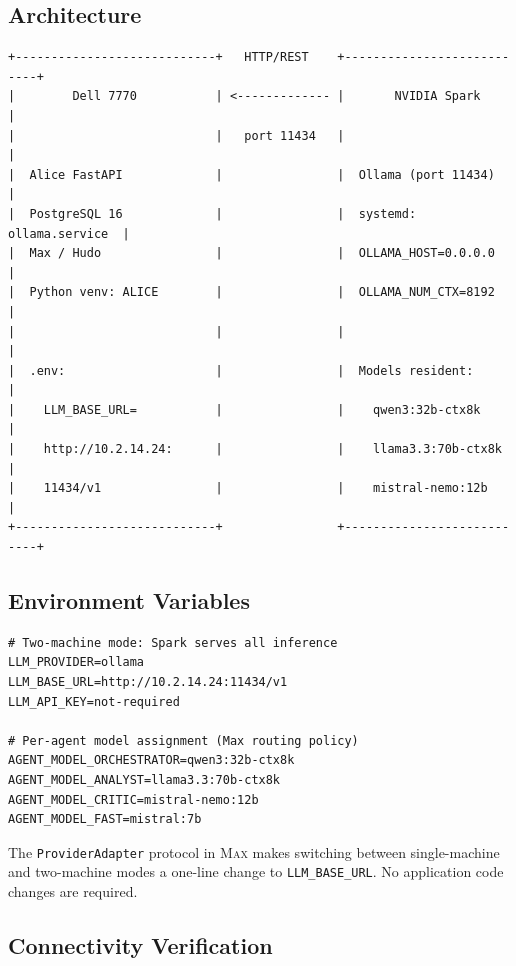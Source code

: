 \subsection{Architecture}

\begin{verbatim}
+----------------------------+   HTTP/REST    +---------------------------+
|        Dell 7770           | <------------- |       NVIDIA Spark        |
|                            |   port 11434   |                           |
|  Alice FastAPI             |                |  Ollama (port 11434)      |
|  PostgreSQL 16             |                |  systemd: ollama.service  |
|  Max / Hudo                |                |  OLLAMA_HOST=0.0.0.0      |
|  Python venv: ALICE        |                |  OLLAMA_NUM_CTX=8192      |
|                            |                |                           |
|  .env:                     |                |  Models resident:         |
|    LLM_BASE_URL=           |                |    qwen3:32b-ctx8k        |
|    http://10.2.14.24:      |                |    llama3.3:70b-ctx8k     |
|    11434/v1                |                |    mistral-nemo:12b       |
+----------------------------+                +---------------------------+
\end{verbatim}

\subsection{Environment Variables}

\begin{lstlisting}[style=bashstyle, caption={.env for two-machine mode (Dell application host)}]
# Two-machine mode: Spark serves all inference
LLM_PROVIDER=ollama
LLM_BASE_URL=http://10.2.14.24:11434/v1
LLM_API_KEY=not-required

# Per-agent model assignment (Max routing policy)
AGENT_MODEL_ORCHESTRATOR=qwen3:32b-ctx8k
AGENT_MODEL_ANALYST=llama3.3:70b-ctx8k
AGENT_MODEL_CRITIC=mistral-nemo:12b
AGENT_MODEL_FAST=mistral:7b
\end{lstlisting}

The \texttt{ProviderAdapter} protocol in \textsc{Max} makes switching
between single-machine and two-machine modes a one-line change to
\texttt{LLM\_BASE\_URL}. No application code changes are required.

\subsection{Connectivity Verification}

